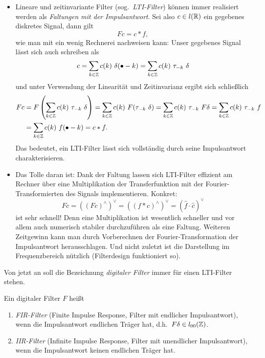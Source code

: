 \begin{remark}\leavevmode
\begin{itemize}
\item Lineare und zeitinvariante Filter (sog.\ \emph{LTI-Filter}) können immer realisiert 
werden als \emph{Faltungen mit der Impulsantwort}. Sei also $ c \in l(\mathbb{R}) $ ein gegebenes diskretes 
Signal, dann gilt
\[
  Fc = c * f,
\]
wie man mit ein wenig Rechnerei nachweisen kann: Unser gegebenes Signal lässt sich auch schreiben
als
\[
  c = \sum_{k \in \Z} c(k) \ \delta(\bullet - k) = \sum_{k \in \Z} c(k) \ \tau_{-k} \ \delta
\]
und unter Verwendung der Linearität und Zeitinvarianz ergibt sich schließlich
\begin{align*}
   Fc
&= F \left( \sum_{k \in \mathbb{Z}} c(k) \ \tau_{-k} \ \delta \right) 
 = \sum_{k \in \mathbb{Z}} c(k) \ F(\tau_{-k} \ \delta)
 = \sum_{k \in \mathbb{Z}} c(k) \ \tau_{-k} \ F \delta
 = \sum_{k \in \mathbb{Z}} c(k) \ \tau_{-k} \ f \\
&= \sum_{k \in \mathbb{Z}} c(k) \ f(\bullet - k) = c * f.
\end{align*}
Das bedeutet, ein LTI-Filter lässt sich vollständig durch seine Impulsantwort charakterisieren.
\item Das Tolle daran ist: Dank der Faltung lassen sich LTI-Filter effizient am Rechner über eine 
Multiplikation der Transferfunktion mit der Fourier-Transformierten des Signals implementieren. 
Konkret:
\[
  Fc = \left( (Fc)^{\wedge} \right)^{\vee} = \left( (f * c)^{\wedge} \right)^{\vee}
     = \left( \widehat{f} \cdot \widehat{c} \right)^{\vee}
\]
ist sehr schnell! Denn eine Multiplikation ist wesentlich schneller und vor allem auch numerisch
stabiler durchzuführen als eine Faltung. Weiteren Zeitgewinn kann man durch Vorberechnen der
Fourier-Transformation der Impulsantwort herausschlagen. Und nicht zuletzt ist die Darstellung im
Frequenzbereich nützlich (Filterdesign funktioniert so).
\end{itemize}
\end{remark}

Von jetzt an soll die Bezeichnung \emph{digitaler Filter} immer für einen LTI-Filter stehen.

\begin{definition}
Ein digitaler Filter $ F $ heißt
\begin{enumerate}
\item \emph{FIR-Filter} (Finite Impulse Response, Filter mit endlicher Impulsantwort), wenn die
  Impulsantwort endlichen Träger hat, d.h.\ $ F\delta \in l_{00}(\mathbb{Z}) $.
\item \emph{IIR-Filter} (Infinite Impulse Response, Filter mit unendlicher Impulsantwort), wenn die
  Impulsantwort keinen endlichen Träger hat.
\end{enumerate}
\end{definition}

